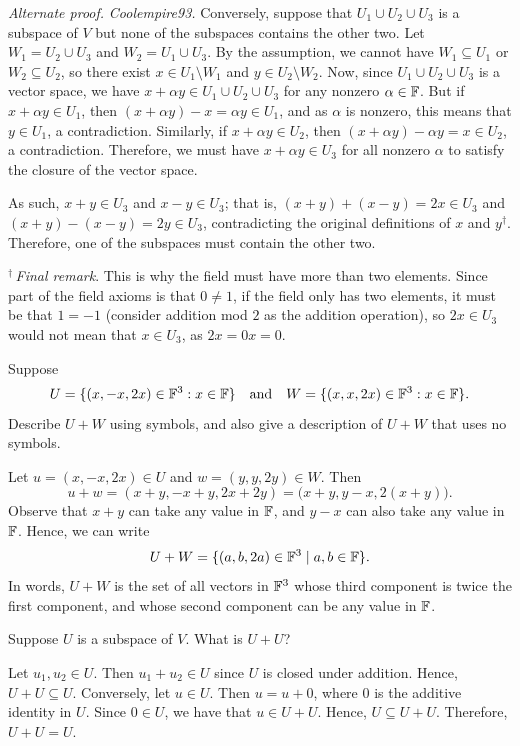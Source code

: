 \begin{exc}
\begin{solution}
\emph{Alternate proof.} \emph{Coolempire93.} Conversely, suppose that
$U_1\cup U_2\cup U_3$ is a subspace of $V$ but none of the subspaces contains
the other two. Let $W_1=U_2\cup U_3$ and $W_2=U_1\cup U_3$. By the assumption,
we cannot have $W_1\subseteq U_1$ or $W_2\subseteq U_2$, so there exist
$x\in U_1\setminus W_1$ and $y\in U_2\setminus W_2$. Now, since
$U_1\cup U_2\cup U_3$ is a vector space, we have
$x+\alpha y\in U_1\cup U_2\cup U_3$ for any nonzero $\alpha\in\mathbb{F}$. But if
$x+\alpha y\in U_1$, then $(x+\alpha y)-x=\alpha y\in U_1$, and as $\alpha$ is
nonzero, this means that $y\in U_1$, a contradiction. Similarly, if
$x+\alpha y\in U_2$, then $(x+\alpha y)-\alpha y=x\in U_2$, a contradiction.
Therefore, we must have $x+\alpha y\in U_3$ for all nonzero $\alpha$ to satisfy
the closure of the vector space.

As such, $x+y\in U_3$ and $x-y\in U_3$; that is, $(x+y)+(x-y)=2x\in U_3$ and
$(x+y)-(x-y)=2y\in U_3$, contradicting the original definitions of $x$ and
$y^\dagger$. Therefore, one of the subspaces must contain the other two.

$^\dagger$\,\emph{Final remark}. This is why the field must have more than two
elements. Since part of the field axioms is that $0\ne1$, if the field only has
two elements, it must be that $1=-1$ (consider addition mod $2$ as the addition
operation), so $2x\in U_3$ would not mean that $x\in U_3$, as $2x=0x=0$.
\end{solution}

\begin{exercise}
Suppose
\[ U = \{(x,-x,2x)\in\mathbb{F}^3 : x\in\mathbb{F}\} \quad\text{and}\quad
   W = \{(x,x,2x)\in\mathbb{F}^3 : x\in\mathbb{F}\}. \]
Describe $U+W$ using symbols, and also give a description of $U+W$ that uses no
symbols.
\end{exercise}
\begin{solution}
Let $u=(x,-x,2x)\in U$ and $w=(y,y,2y)\in W$. Then
\[ u+w = (x+y,-x+y,2x+2y) = \bigl(x+y,y-x,2(x+y)\bigr). \]
Observe that $x+y$ can take any value in $\mathbb{F}$, and $y-x$ can also take any value
in $\mathbb{F}$. Hence, we can write
\[ U+W = \{(a,b,2a)\in\mathbb{F}^3 \mid a,b\in\mathbb{F}\}. \]
In words, $U+W$ is the set of all vectors in $\mathbb{F}^3$ whose third component is
twice the first component, and whose second component can be any value in
$\mathbb{F}$.
\end{solution}

\begin{exercise}
Suppose $U$ is a subspace of $V$. What is $U+U$?
\end{exercise}
\begin{solution}
Let $u_1,u_2\in U$. Then $u_1+u_2\in U$ since $U$ is closed under addition.
Hence, $U+U\subseteq U$. Conversely, let $u\in U$. Then $u=u+0$, where $0$ is
the additive identity in $U$. Since $0\in U$, we have that $u\in U+U$. Hence,
$U\subseteq U+U$. Therefore, $U+U=U$.
\end{solution}


\end{exc}
